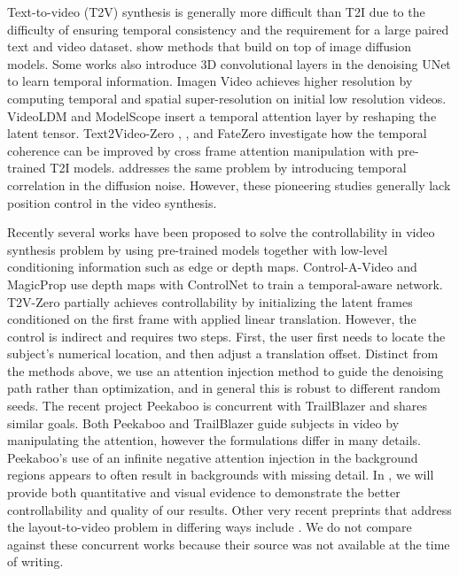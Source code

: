 Text-to-video (T2V) synthesis is generally more difficult than T2I due to the difficulty of ensuring temporal consistency and the requirement for a large paired text and video dataset. \cite{ho2022video,harvey2022flexible,Infilling2022,voleti2022MCVD,yang2022diffusion,nvidianoiseprior} show methods that build on top of image diffusion models. Some works \cite{blattmann2023videoldm,luo2023videofusion} also introduce 3D convolutional layers in the denoising UNet to learn temporal information. Imagen Video \cite{Ho2022ImagenVH} achieves higher resolution by computing temporal and spatial super-resolution on initial low resolution videos. VideoLDM \cite{blattmann2023videoldm} and ModelScope \cite{luo2023videofusion} insert a temporal attention layer by reshaping the latent tensor. Text2Video-Zero \cite{text2video-zero}, , and FateZero \cite{qi2023fatezero} investigate how the temporal coherence can be improved by cross frame attention manipulation with pre-trained T2I models. \cite{nvidianoiseprior} addresses the same problem by introducing temporal correlation in the diffusion noise.
However, these pioneering studies generally lack position control in the video synthesis.

Recently several works have been proposed to solve the controllability in video synthesis problem by using pre-trained models together with low-level conditioning information such as edge or depth maps. Control-A-Video \cite{chen2023controlavideo} and MagicProp \cite{yan2023magicprop} use depth maps with ControlNet to train a temporal-aware network. T2V-Zero \cite{text2video-zero} partially achieves controllability by initializing the latent frames conditioned on the first frame with applied linear translation. However, the control is indirect and requires two steps. First, the user first needs to locate the subject's numerical location, and then adjust a translation offset. Distinct from the methods above, we use an attention injection method to guide the denoising path rather than optimization, and in general this is robust to different random seeds. The recent project Peekaboo \cite{jain2023peekaboo} is concurrent with TrailBlazer and shares similar goals.  Both Peekaboo and TrailBlazer guide subjects in video by manipulating the attention, however the formulations differ in many details. Peekaboo's use of an infinite negative attention injection in the background regions appears to often result in backgrounds with missing detail. 
In , we will provide both quantitative and visual evidence to demonstrate the better controllability and quality of our results. 
Other very recent preprints that address the layout-to-video problem in differing ways include \cite{lian2023llmgrounded, wang2024boximator, yang2024directavideo}. We do not compare against these concurrent works because their source was not available at the time of writing.
